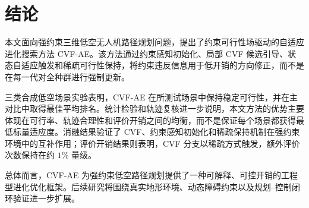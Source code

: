 \section{结论}
\label{sec:conclusion}

本文面向强约束三维低空无人机路径规划问题，提出了约束可行性场驱动的自适应进化搜索方法 CVF-AE。该方法通过约束感知初始化、局部 CVF 候选引导、状态自适应触发和稀疏可行性保持，将约束违反信息用于低开销的方向修正，而不是在每一代对全种群进行强制更新。

三类合成低空场景实验表明，CVF-AE 在所测试场景中保持稳定可行性，并在主对比中取得最佳平均排名。统计检验和轨迹复核进一步说明，本文方法的优势主要体现在可行率、轨迹合理性和评价开销之间的均衡，而不是保证每个场景都获得最低标量适应度。消融结果验证了 CVF、约束感知初始化和稀疏保持机制在强约束环境中的互补作用；评价开销结果则表明，CVF 分支以稀疏方式触发，额外评价次数保持在约 $1\%$ 量级。

总体而言，CVF-AE 为强约束低空路径规划提供了一种可解释、可控开销的工程型进化优化框架。后续研究将围绕真实地形环境、动态障碍约束以及规划--控制闭环验证进一步扩展。
